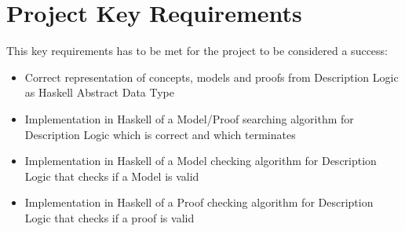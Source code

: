 \documentclass[12pt]{article}
\begin{document}
\section{Project Key Requirements}

This key requirements has to be met for the project to be considered a success:

\begin{itemize}
\item Correct representation of concepts, models and proofs from Description Logic as Haskell Abstract Data Type
\item Implementation in Haskell of a Model/Proof searching algorithm for Description Logic which is correct and which terminates
\item Implementation in Haskell of a Model checking algorithm for Description Logic that checks
if a Model is valid
\item Implementation in Haskell of a Proof checking algorithm for Description Logic that checks if a proof is valid
\end{itemize}
\end{document}
